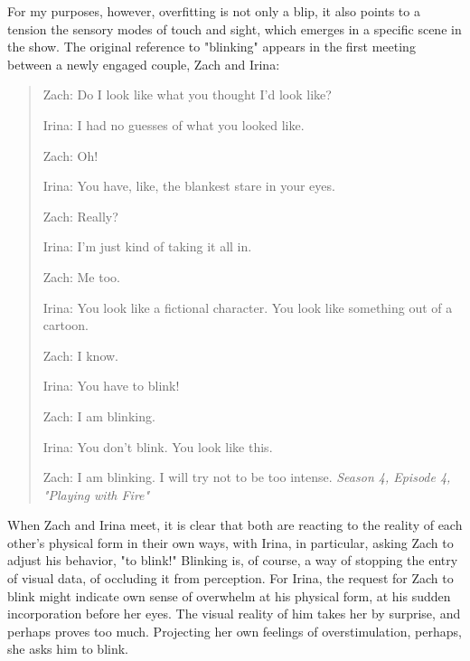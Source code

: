 \documentclass[11pt]{article}
\begin{document}
For my purposes, however, overfitting is not only a blip, it also
points to a tension the sensory modes of touch and sight, which
emerges in a specific scene in the show. The original reference to
"blinking" appears in the first meeting between a newly engaged
couple, Zach and Irina:
\begin{quote}
Zach: Do I look like what you thought I'd look like?

Irina: I had no guesses of what you looked like.

Zach: Oh!

Irina: You have, like, the blankest stare in your eyes.

Zach: Really?

Irina: I'm just kind of taking it all in.

Zach: Me too.

Irina: You look like a fictional character. You look like something
out of a cartoon.

Zach: I know.

Irina: You have to blink!

Zach: I am blinking.

Irina: You don't blink. You look like this.

Zach: I am blinking. I will try not to be too intense. \emph{Season 4,
Episode 4, "Playing with Fire"}
\end{quote}
When Zach and Irina meet, it is clear that both are reacting to the
reality of each other's physical form in their own ways, with Irina,
in particular, asking Zach to adjust his behavior, "to blink!"
Blinking is, of course, a way of stopping the entry of visual data, of
occluding it from perception. For Irina, the request for Zach to blink
might indicate own sense of overwhelm at his physical form, at his
sudden incorporation before her eyes. The visual reality of him takes
her by surprise, and perhaps proves too much. Projecting her own
feelings of overstimulation, perhaps, she asks him to blink.
\end{document}
